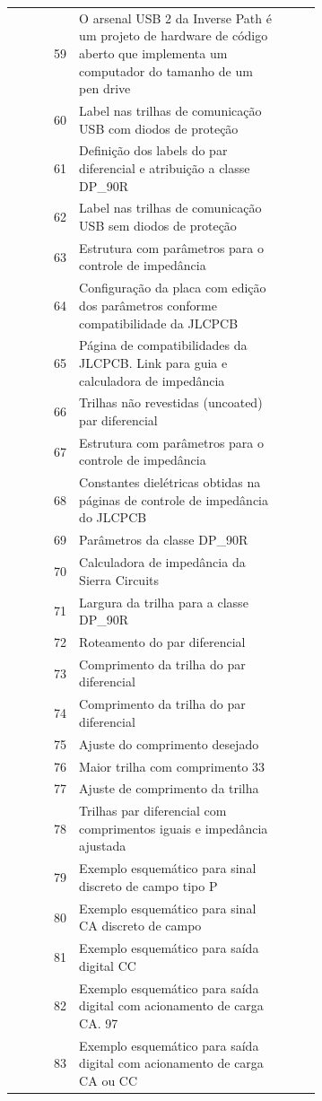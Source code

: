 \begin{longtable}{@{}r>{\raggedright\arraybackslash}p{0.68\linewidth}r@{}}
59 & O arsenal USB 2 da Inverse Path é um projeto de hardware de código aberto que implementa um computador do tamanho de um pen drive & \pageref{fig:59} \\
60 & Label nas trilhas de comunicação USB com diodos de proteção & \pageref{fig:60} \\
61 & Definição dos labels do par diferencial e atribuição a classe DP\_90R & \pageref{fig:61} \\
62 & Label nas trilhas de comunicação USB sem diodos de proteção & \pageref{fig:62} \\
63 & Estrutura com parâmetros para o controle de impedância & \pageref{fig:63} \\
64 & Configuração da placa com edição dos parâmetros conforme compatibilidade da JLCPCB & \pageref{fig:64} \\
65 & Página de compatibilidades da JLCPCB. Link para guia e calculadora de impedância & \pageref{fig:65} \\
66 & Trilhas não revestidas (uncoated) par diferencial & \pageref{fig:66} \\
67 & Estrutura com parâmetros para o controle de impedância & \pageref{fig:67} \\
68 & Constantes dielétricas obtidas na páginas de controle de impedância do JLCPCB & \pageref{fig:68} \\
69 & Parâmetros da classe DP\_90R & \pageref{fig:69} \\
70 & Calculadora de impedância da Sierra Circuits & \pageref{fig:70} \\
71 & Largura da trilha para a classe DP\_90R & \pageref{fig:71} \\
72 & Roteamento do par diferencial & \pageref{fig:72} \\
73 & Comprimento da trilha do par diferencial & \pageref{fig:73} \\
74 & Comprimento da trilha do par diferencial & \pageref{fig:74} \\
75 & Ajuste do comprimento desejado & \pageref{fig:75} \\
76 & Maior trilha com comprimento 33 & \pageref{fig:76} \\
77 & Ajuste de comprimento da trilha & \pageref{fig:77} \\
78 & Trilhas par diferencial com comprimentos iguais e impedância ajustada & \pageref{fig:78} \\
79 & Exemplo esquemático para sinal discreto de campo tipo P & \pageref{fig:79} \\
80 & Exemplo esquemático para sinal CA discreto de campo & \pageref{fig:80} \\
81 & Exemplo esquemático para saída digital CC & \pageref{fig:81} \\
82 & Exemplo esquemático para saída digital com acionamento de carga CA. 97 & \pageref{fig:82} \\
83 & Exemplo esquemático para saída digital com acionamento de carga CA ou CC & \pageref{fig:83} \\
\end{longtable}
\endgroup
